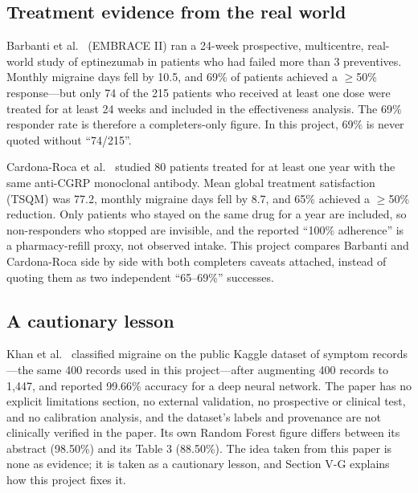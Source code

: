 \documentclass[conference]{IEEEtran}
\begin{document}
\subsection{Treatment evidence from the real world}
Barbanti et al.~\cite{barbanti2025} (EMBRACE II) ran a 24-week prospective, multicentre, real-world study of eptinezumab in patients who had failed more than 3 preventives. Monthly migraine days fell by 10.5, and 69\% of patients achieved a $\geq$50\% response---but only 74 of the 215 patients who received at least one dose were treated for at least 24 weeks and included in the effectiveness analysis. The 69\% responder rate is therefore a completers-only figure. In this project, 69\% is never quoted without ``74/215''.

Cardona-Roca et al.~\cite{cardonaroca2025} studied 80 patients treated for at least one year with the same anti-CGRP monoclonal antibody. Mean global treatment satisfaction (TSQM) was 77.2, monthly migraine days fell by 8.7, and 65\% achieved a $\geq$50\% reduction. Only patients who stayed on the same drug for a year are included, so non-responders who stopped are invisible, and the reported ``100\% adherence'' is a pharmacy-refill proxy, not observed intake. This project compares Barbanti and Cardona-Roca side by side with both completers caveats attached, instead of quoting them as two independent ``65--69\%'' successes.

\subsection{A cautionary lesson}
Khan et al.~\cite{khan2024} classified migraine on the public Kaggle dataset of symptom records---the same 400 records used in this project---after augmenting 400 records to 1,447, and reported 99.66\% accuracy for a deep neural network. The paper has no explicit limitations section, no external validation, no prospective or clinical test, and no calibration analysis, and the dataset's labels and provenance are not clinically verified in the paper. Its own Random Forest figure differs between its abstract (98.50\%) and its Table 3 (88.50\%). The idea taken from this paper is none as evidence; it is taken as a cautionary lesson, and Section V-G explains how this project fixes it.
\end{document}
